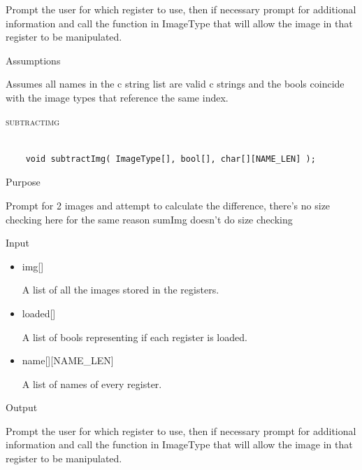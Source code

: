 \documentclass[pdftex, 11pt]{article}
\begin{document}
\begin{description}
\begin{description}
				Prompt the user for which register to use, then if necessary
				prompt for additional information and call the function
				in ImageType that will allow the image in that register to
				be manipulated.

			\item{Assumptions}

				Assumes all names in the c string list are valid c
				strings and the bools coincide with the image types that
				reference the same index.

		\end{description}



	\item{\textsc{subtractimg}}

		\begin{lstlisting}

	void subtractImg( ImageType[], bool[], char[][NAME_LEN] );
		\end{lstlisting}

		\begin{description}
			\item{Purpose}

				Prompt for 2 images and attempt to calculate the difference, there's no size
				checking here for the same reason sumImg doesn't do size checking

			\item{Input}

				\begin{itemize}

					\item{img[]}

						A list of all the images stored in the registers.

					\item{loaded[]}

						A list of bools representing if each register is loaded.

					\item{name[][NAME\_LEN]}

						A list of names of every register.

				\end{itemize}

			\item{Output}

				Prompt the user for which register to use, then if necessary
				prompt for additional information and call the function
				in ImageType that will allow the image in that register to
				be manipulated.


\end{description}
\end{description}
\end{document}
